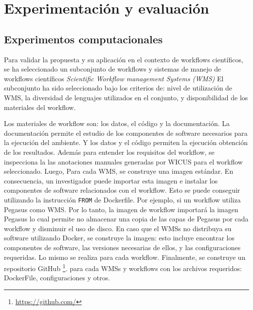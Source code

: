 \chapter{Experimentación y evaluación}

\section{Experimentos computacionales}\label{s5.1}

Para validar la propuesta y su aplicación en el contexto de workflows científicos, se ha seleccionado un subconjunto de workflows y sistemas de manejo de workflows científicos \emph{Scientific Workflow management Systems (WMS)}
El subconjunto ha sido seleccionado bajo los criterios de: nivel de utilización de WMS, la diversidad de lenguajes utilizados en el conjunto, y disponibilidad de los materiales del workflow. 

Los materiales de workflow son: los datos, el código y la documentación. La documentación permite el estudio de los componentes de software necesarios para la ejecución del ambiente. Y los datos y el código permiten la ejecución obtención de los resultados.
Además para entender los requisitos del workflow, se inspecciona la las anotaciones manuales generadas por WICUS \cite{santana2017reproducibility} para el workflow seleccionado.
Luego, Para cada WMS, se construye una imagen estándar. En consecuencia, un investigador puede importar esta imagen e instalar los componentes de software relacionados con el workflow.
Esto se puede conseguir utilizando la instrucción \texttt{FROM} de Dockerfile. Por ejemplo, si un workflow utiliza Pegasus como WMS. Por lo tanto, la imagen de workflow importará la imagen Pegasus lo cual permite no almacenar una copia de las capas de Pegasus por cada workflow y disminuir el uso de disco.
En caso que el WMSs no distribuya su software utilizando Docker, se construye la imagen: esto incluye encontrar los componentes de software, las versiones necesarias de ellos, y las configuraciones requeridas. Lo mismo se realiza para cada workflow. 
Finalmente, se construye un repositorio GitHub \footnote{\url{https://github.com/}}. para cada WMSs y workflows con los archivos requeridos: DockerFile, configuraciones y otros.

